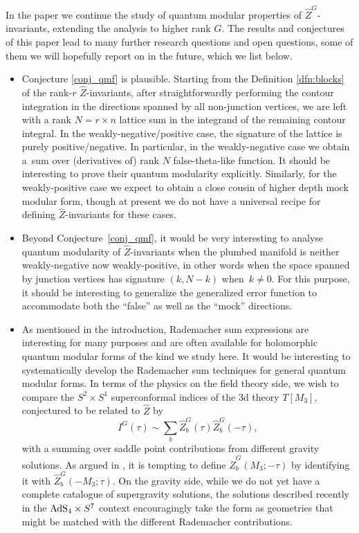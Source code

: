 \documentclass[pdftex]{sigma}
\theoremstyle{definition}
\numberwithin{equation}{section}
\begin{document}
In the paper we continue the study of quantum modular properties of $\widehat Z^G$-invariants, extending the analysis to higher rank $G$. The results and conjectures of this paper lead to many further research questions and open questions, some of them we will hopefully report on in the future, which we list below.
\begin{itemize}\itemsep=0pt
 \item Conjecture \ref{conj_qmf} is plausible. Starting from the Definition \ref{dfn:blocks} of the rank-$r$ $\widehat Z$-invariants, after straightforwardly performing the contour integration in the directions spanned by all non-junction vertices, we are left with a rank $N=r\times n$ lattice sum in the integrand of the remaining contour integral. In the weakly-negative/positive case, the signature of the lattice is purely positive/negative. In particular, in the weakly-negative case we obtain a~sum over (derivatives of) rank $N$ false-theta-like function. It should be interesting to prove their quantum modularity explicitly. Similarly, for the weakly-positive case we expect to obtain a close cousin of higher depth mock modular form, though at present we do not have a universal recipe for defining $\widehat Z$-invariants for these cases.
 \item Beyond Conjecture~\ref{conj_qmf}, it would be very interesting to analyse quantum modularity of $\widehat Z$-invariants when the plumbed manifold is neither weakly-negative now weakly-positive, in other words when the space spanned by junction vertices has signature $(k,N-k)$ when~$k\neq 0$. For this purpose, it should be interesting to generalize the generalized error function \cite{Alexandrov:2016enp, Bringmann:2021dxg} to accommodate both the ``false'' as well as the ``mock'' directions.
 \item As mentioned in the introduction, Rademacher sum expressions are interesting for many purposes and are often available for holomorphic quantum modular forms of the kind we study here. It would be interesting to systematically develop the Rademacher sum techniques for general quantum modular forms. In terms of the physics on the field theory side, we wish to compare the $S^2\times S^1$ superconformal indices of the 3d theory $T[M_3]$, conjectured to be related to $\widehat Z$ by
 \[
 I^G(\tau)\sim \sum_b \widehat Z^G_b(\tau) \widehat Z^G_b(-\tau),
 \]
 with a summing over saddle point contributions from different gravity solutions. As argued in \cite{cheng20193d}, it is tempting to define $\widehat Z^G_b(M_3;-\tau)$ by identifying it with $\widehat Z^G_b(-M_3;\tau)$. On the gravity side, while we do not yet have a complete catalogue of supergravity solutions, the solutions described recently \cite{BenettiGenolini:2023rkq} in the ${\rm AdS}_4\times S^7$ context encouragingly take the form as geometries that might be matched with the different Rademacher contributions.

\end{itemize}
\end{document}
